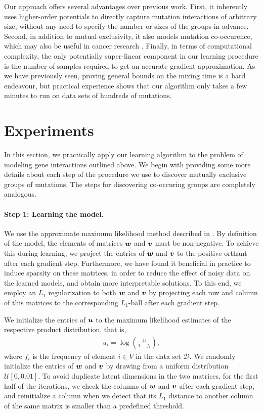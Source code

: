 Our approach offers several advantages over previous work.
First, it inherently uses higher-order potentials to directly capture mutation interactions of arbitrary size, without any need to specify the number or sizes of the groups in advance.
Second, in addition to mutual exclusivity, it also models mutation co-occurence, which may also be useful in cancer research \citep{yeang08,raphael14}.
Finally, in terms of computational complexity, the only potentially super-linear component in our learning procedure is the number of samples required to get an accurate gradient approximation.
As we have previously seen, proving general bounds on the mixing time is a hard endeavour, but practical experience shows that our algorithm only takes a few minutes to run on data sets of hundreds of mutations.


\section{Experiments}
In this section, we practically apply our learning algorithm to the problem of modeling gene interactions outlined above.
We begin with providing some more details about each step of the procedure we use to discover mutually exclusive groups of mutations.
The steps for discovering co-occuring groups are completely analogous.

\paragraph{Step 1: Learning the \fldc{} model.}
We use the approximate maximum likelihood method described in .
By definition of the \fldc{} model, the elements of matrices $\bm{w}$ and $\bm{v}$ must be non-negative.
To achieve this during learning, we project the entries of $\bm{w}$ and $\bm{v}$ to the positive orthant after each gradient step.
Furthermore, we have found it beneficial in practice to induce sparsity on these matrices, in order to reduce the effect of noisy data on the learned models, and obtain more interpretable solutions.
To this end, we employ an $L_1$ regularization to both $\bm{w}$ and $\bm{v}$ by projecting each row and column of this matrices to the corresponding $L_1$-ball after each gradient step.

We initialize the entries of $\bm{u}$ to the maximum likelihood estimates of the respective product distribution, that is,
\begin{align*}
u_i = \log\left( \frac{f_i}{1 - f_i} \right),
\end{align*}
where $f_i$ is the frequency of element $i \in V$ in the data set $\mathcal{D}$.
We randomly initialize the entries of $\bm{w}$ and $\bm{v}$ by drawing from a uniform distribution $\mathcal{U}[0, 0.01]$.
To avoid duplicate latent dimensions in the two matrices, for the first half of the iterations, we check the columns of $\bm{w}$ and $\bm{v}$ after each gradient step, and reinitialize a column when we detect that its $L_1$ distance to another column of the same matrix is smaller than a predefined threshold.

